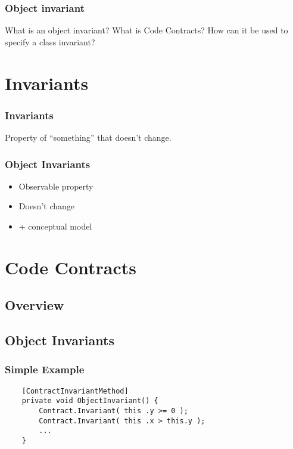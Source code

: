 

\begin{frame}
    \frametitle{Object invariant}

    What is an object invariant? What is Code Contracts? How can it be used to
    specify a class invariant?
\end{frame}

\section{Invariants}

\begin{frame}
    \frametitle{Invariants}

    Property of ``something'' that doesn't change.
\end{frame}

\begin{frame}
    \frametitle{Object Invariants}

    \begin{itemize}
        \item Observable property
        \item Doesn't change
        \item + conceptual model
    \end{itemize}
\end{frame}

\section{Code Contracts}

\subsection{Overview}



\subsection{Object Invariants}

\begin{frame}[fragile]
    \frametitle{Simple Example}
    \begin{verbatim}
    [ContractInvariantMethod]
    private void ObjectInvariant() {
        Contract.Invariant( this .y >= 0 );
        Contract.Invariant( this .x > this.y );
        ...
    }
    \end{verbatim}
\end{frame}

